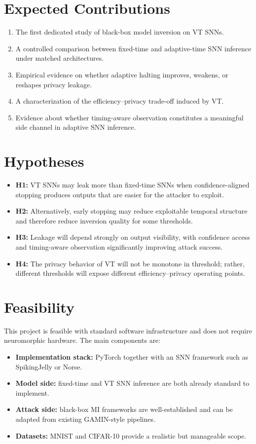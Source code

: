 \documentclass[11pt]{article}
\begin{document}
\section{Expected Contributions}
\begin{enumerate}[leftmargin=1.3em]
\item The first dedicated study of black-box model inversion on VT SNNs.
\item A controlled comparison between fixed-time and adaptive-time SNN inference under matched architectures.
\item Empirical evidence on whether adaptive halting improves, weakens, or reshapes privacy leakage.
\item A characterization of the efficiency--privacy trade-off induced by VT.
\item Evidence about whether timing-aware observation constitutes a meaningful side channel in adaptive SNN inference.
\end{enumerate}

\section{Hypotheses}
\begin{itemize}[leftmargin=1.3em]
\item \textbf{H1:} VT SNNs may leak more than fixed-time SNNs when confidence-aligned stopping produces outputs that are easier for the attacker to exploit.
\item \textbf{H2:} Alternatively, early stopping may reduce exploitable temporal structure and therefore reduce inversion quality for some thresholds.
\item \textbf{H3:} Leakage will depend strongly on output visibility, with confidence access and timing-aware observation significantly improving attack success.
\item \textbf{H4:} The privacy behavior of VT will not be monotone in threshold; rather, different thresholds will expose different efficiency--privacy operating points.
\end{itemize}

\section{Feasibility}
This project is feasible with standard software infrastructure and does not require neuromorphic hardware. The main components are:
\begin{itemize}[leftmargin=1.3em]
\item \textbf{Implementation stack:} PyTorch together with an SNN framework such as SpikingJelly or Norse.
\item \textbf{Model side:} fixed-time and VT SNN inference are both already standard to implement.
\item \textbf{Attack side:} black-box MI frameworks are well-established and can be adapted from existing GAMIN-style pipelines.
\item \textbf{Datasets:} MNIST and CIFAR-10 provide a realistic but manageable scope.
\end{itemize}
\end{document}
